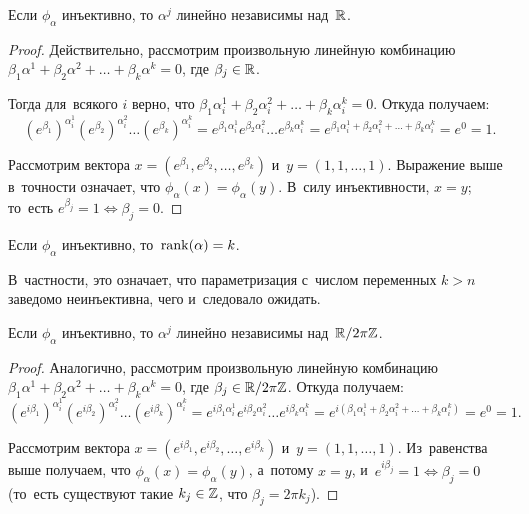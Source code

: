 \documentclass{article}
\begin{document}
\begin{lemma*}
    Если $\phi_\alpha$ инъективно, то $\alpha^j$ линейно независимы над~$\mathbb{R}$.
\end{lemma*}

\begin{proof}
    Действительно, рассмотрим произвольную линейную комбинацию $ \beta_1 \alpha^1 + \beta_2 \alpha^2 + \ldots + \beta_k \alpha^k = 0$,
    где $\beta_j \in \mathbb{R}$.

    Тогда для~всякого $i$ верно, что $ \beta_1 \alpha_i^1 + \beta_2 \alpha_i^2 + \ldots + \beta_k \alpha_i^k = 0$.
    Откуда получаем:
    $$
        (e^{\beta_1})^{\alpha_i^1} (e^{\beta_2})^{\alpha_i^2} \ldots (e^{\beta_k})^{\alpha_i^k} =
        e^{\beta_1 \alpha_i^1} e^{\beta_2 \alpha_i^2} \ldots e^{\beta_k \alpha_i^k} =
        e^{\beta_1 \alpha_i^1 + \beta_2 \alpha_i^2 + \ldots + \beta_k \alpha_i^k} =
        e^0 = 1.
    $$

    Рассмотрим вектора $x = (e^{\beta_1}, e^{\beta_2}, \ldots, e^{\beta_k})$ и~$y = (1, 1, \ldots, 1)$.
    Выражение выше в~точности означает, что $\phi_\alpha(x) = \phi_\alpha(y)$. В~силу инъективности, $x = y$;
    то~есть $e^{\beta_j} = 1 \Leftrightarrow \beta_j = 0$.
\end{proof}

\begin{consequence*}
    Если $\phi_\alpha$ инъективно, то~$\mathrm{rank}(\alpha) = k$.
\end{consequence*}

В~частности, это означает, что параметризация с~числом переменных $k > n$ заведомо неинъективна, чего и~следовало ожидать.

\begin{lemma*}
    Если $\phi_\alpha$ инъективно, то $\alpha^j$ линейно независимы над~$\mathbb{R} / 2 \pi \mathbb{Z}$.
\end{lemma*}

\begin{proof}
    Аналогично, рассмотрим произвольную линейную комбинацию $\beta_1 \alpha^1 + \beta_2 \alpha^2 + \ldots + \beta_k \alpha^k = 0$,
    где $\beta_j \in \mathbb{R} / 2 \pi \mathbb{Z}$. Откуда получаем:
    $$
        (e^{i\beta_1})^{\alpha_i^1} (e^{i\beta_2})^{\alpha_i^2} \ldots (e^{i\beta_k})^{\alpha_i^k} =
        e^{i\beta_1 \alpha_i^1} e^{i\beta_2 \alpha_i^2} \ldots e^{i\beta_k \alpha_i^k} =
        e^{i(\beta_1 \alpha_i^1 + \beta_2 \alpha_i^2 + \ldots + \beta_k \alpha_i^k)} =
        e^0 = 1.
    $$

    Рассмотрим вектора $x = (e^{i\beta_1}, e^{i\beta_2}, \ldots, e^{i\beta_k})$ и~$y = (1, 1, \ldots, 1)$.
    Из~равенства выше получаем, что $\phi_\alpha(x) = \phi_\alpha(y)$, а~потому $x = y$, и~$e^{i\beta_j} = 1 \Leftrightarrow \beta_j = 0$
    (то~есть существуют такие $k_j \in \mathbb{Z}$, что $\beta_j = 2 \pi k_j$).
\end{proof}
\end{document}
